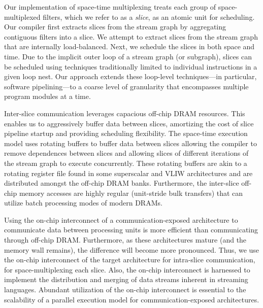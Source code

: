 Our implementation of space-time multiplexing treats each group of
space-multiplexed filters, which we refer to as a {\it slice}, as an
atomic unit for scheduling. Our compiler first extracts slices from
the stream graph by aggregating contiguous filters into a slice. We
attempt to extract slices from the stream graph that are internally
load-balanced. Next, we schedule the slices in both space and time.
Due to the implicit outer loop of a stream graph (or
subgraph), slices can be scheduled using techniques traditionally
limited to individual instructions in a given loop nest.  Our approach
extends these loop-level techniques---in particular, software
pipelining---to a coarse level of granularity that encompasses
multiple program modules at a time.

Inter-slice communication leverages capacious off-chip DRAM resources.
This enables us to aggressively buffer data between slices, amortizing
the cost of slice pipeline startup and providing scheduling
flexibility. The space-time execution model uses rotating buffers to
buffer data between slices allowing the compiler to remove dependences
between slices and allowing slices of different iterations of the
stream graph to execute concurrently.  These rotating buffers are akin
to a rotating register file found in some superscalar and VLIW
architectures and are distributed amongst the off-chip DRAM
banks. Furthermore, the inter-slice off-chip memory accesses are
highly regular (unit-stride bulk transfers) that can utilize batch
processing modes of modern DRAMs. 

Using the on-chip interconnect of a communication-exposed architecture
to communicate data between processing units is more efficient than
communicating through off-chip DRAM. Furthermore, as these
architectures mature (and the memory wall remains), the difference
will become more pronounced.  Thus, we use the on-chip interconnect of
the target architecture for intra-slice communication, for
space-multiplexing each slice.  Also, the on-chip interconnect is
harnessed to implement the distribution and merging of data streams
inherent in streaming languages. Abundant utilization of the on-chip
interconnect is essential to the scalability of a parallel execution
model for communication-exposed architectures.

